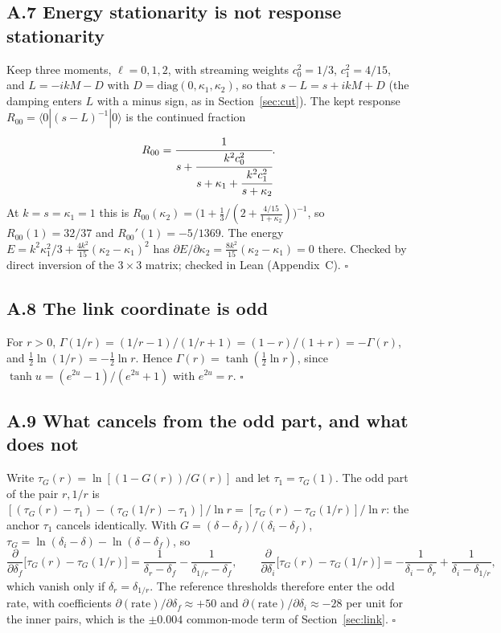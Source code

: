 \documentclass[11pt]{article}
\begin{document}
\subsection*{A.7 Energy stationarity is not response stationarity}
Keep three moments, $\ell=0,1,2$, with streaming weights $c_0^2=1/3$, $c_1^2=4/15$, and $L=-ikM-D$ with $D=\mathrm{diag}(0,\kappa_1,\kappa_2)$, so that $s-L=s+ikM+D$ (the damping enters $L$ with a minus sign, as in Section~\ref{sec:cut}). The kept response $R_{00}=\langle0|(s-L)^{-1}|0\rangle$ is the continued fraction
\[
R_{00}=\cfrac{1}{s+\cfrac{k^2c_0^2}{s+\kappa_1+\cfrac{k^2c_1^2}{s+\kappa_2}}} .
\]
At $k=s=\kappa_1=1$ this is $R_{00}(\kappa_2)=\big(1+\tfrac13/(2+\tfrac{4/15}{1+\kappa_2})\big)^{-1}$, so $R_{00}(1)=32/37$ and $R_{00}'(1)=-5/1369$. The energy $E=k^2\kappa_1^2/3+\tfrac{4k^2}{15}(\kappa_2-\kappa_1)^2$ has $\partial E/\partial\kappa_2=\tfrac{8k^2}{15}(\kappa_2-\kappa_1)=0$ there. Checked by direct inversion of the $3\times3$ matrix; checked in Lean (Appendix~C). $\square$

\subsection*{A.8 The link coordinate is odd}
For $r>0$, $\Gamma(1/r)=(1/r-1)/(1/r+1)=(1-r)/(1+r)=-\Gamma(r)$, and $\tfrac12\ln(1/r)=-\tfrac12\ln r$. Hence $\Gamma(r)=\tanh(\tfrac12\ln r)$, since $\tanh u=(e^{2u}-1)/(e^{2u}+1)$ with $e^{2u}=r$. $\square$

\subsection*{A.9 What cancels from the odd part, and what does not}
Write $\tau_G(r)=\ln[(1-G(r))/G(r)]$ and let $\tau_1=\tau_G(1)$. The odd part of the pair $r,1/r$ is $[(\tau_G(r)-\tau_1)-(\tau_G(1/r)-\tau_1)]/\ln r=[\tau_G(r)-\tau_G(1/r)]/\ln r$: the anchor $\tau_1$ cancels identically. With $G=(\delta-\delta_f)/(\delta_i-\delta_f)$, $\tau_G=\ln(\delta_i-\delta)-\ln(\delta-\delta_f)$, so
\[
\frac{\partial}{\partial\delta_f}\big[\tau_G(r)-\tau_G(1/r)\big]=\frac1{\delta_r-\delta_f}-\frac1{\delta_{1/r}-\delta_f},\qquad
\frac{\partial}{\partial\delta_i}\big[\tau_G(r)-\tau_G(1/r)\big]=-\frac1{\delta_i-\delta_r}+\frac1{\delta_i-\delta_{1/r}},
\]
which vanish only if $\delta_r=\delta_{1/r}$. The reference thresholds therefore enter the odd rate, with coefficients $\partial(\text{rate})/\partial\delta_f\approx+50$ and $\partial(\text{rate})/\partial\delta_i\approx-28$ per unit for the inner pairs, which is the $\pm0.004$ common-mode term of Section~\ref{sec:link}. $\square$
\end{document}
